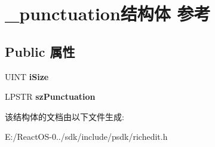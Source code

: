 \hypertarget{struct__punctuation}{}\section{\+\_\+punctuation结构体 参考}
\label{struct__punctuation}
\subsection*{Public 属性}
\begin{DoxyCompactItemize}
\item 
\mbox{\label{struct__punctuation_a1516bcfe8d59412a7fbd473f17e4cb3c}} 
U\+I\+NT {\bfseries i\+Size}
\item 
\mbox{\label{struct__punctuation_a99db33016c61c7561cbbe708aacabdaf}} 
L\+P\+S\+TR {\bfseries sz\+Punctuation}
\end{DoxyCompactItemize}


该结构体的文档由以下文件生成\+:\begin{DoxyCompactItemize}
\item 
E\+:/\+React\+O\+S-\/0../sdk/include/psdk/richedit.\+h\end{DoxyCompactItemize}
